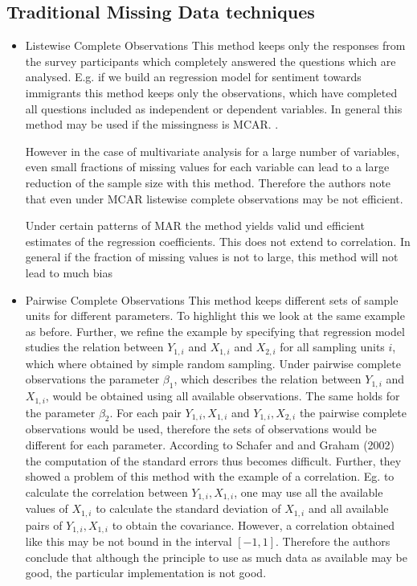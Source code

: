 \subsection{Traditional Missing Data techniques} 
\begin{itemize}
\item Listewise Complete Observations
This method keeps only the responses from the survey participants which completely answered the questions which are analysed.  E.g. if we build an regression model for sentiment towards immigrants this method keeps only the observations, which have completed all questions included as independent or dependent variables. 
In general this method may be used if the missingness is MCAR. .  \par However in the case of multivariate analysis for a large number of variables, even small fractions of missing values for each variable can lead to a large reduction of the sample size with this method. Therefore the authors note that even under MCAR listewise complete observations may be not efficient. \par Under certain patterns of MAR the method yields valid und efficient estimates of the regression coefficients. This does not extend to correlation. In general if the fraction of missing values is not to large, this method will not lead to much bias \cite{schafer2002missing}
\item Pairwise Complete Observations 
This method keeps different sets of sample units for different parameters. To highlight this we look at the same example as before. Further, we refine the example by specifying that regression model studies the relation between $Y_{1,i}$ and $X_{1,i}$ and $X_{2,i}$ for all sampling units $i$, which where obtained by simple random sampling. Under pairwise complete observations the parameter $\beta_1$, which describes the relation between  $Y_{1,i}$ and $X_{1,i}$, would be obtained using all available observations. The same holds for the parameter $\beta_2$. For each pair $Y_{1,i} , X_{1,i}$  and  $Y_{1,i} , X_{2,i}$ the pairwise complete observations would be used, therefore the sets of observations would be different for each parameter. According to Schafer and and Graham (2002) the computation of the standard errors thus becomes difficult. Further,  they showed a problem of this method with the example of a correlation. Eg. to calculate the correlation between $Y_{1,i} , X_{1,i}$, one may use all the available values of $X_{1,i}$ to calculate the standard deviation of $X_{1,i}$ and all available pairs of $Y_{1,i} , X_{1,i}$ to obtain the covariance. However, a correlation obtained like this may be not bound in the interval $[-1,1]$. Therefore the authors conclude that although the principle to use as much data as available may be good, the particular implementation is not good.

\end{itemize}
